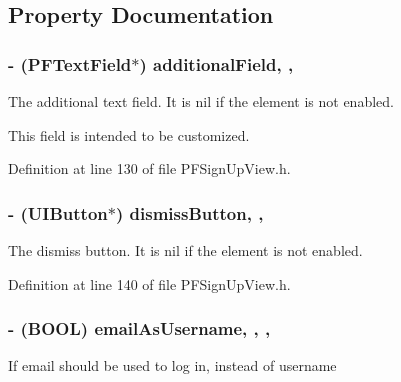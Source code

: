 \subsection{Property Documentation}
\hypertarget{interface_p_f_sign_up_view_ad99c2db623f95565e79418076b0bc111}{}
\subsubsection[{additional\+Field}]{\setlength{\rightskip}{0pt plus 5cm}-\/ ({\bf P\+F\+Text\+Field}$\ast$) additional\+Field\hspace{0.3cm}{\ttfamily [read]}, {\ttfamily [nonatomic]}, {\ttfamily [strong]}}\label{interface_p_f_sign_up_view_ad99c2db623f95565e79418076b0bc111}
The additional text field. It is {\ttfamily nil} if the element is not enabled.

This field is intended to be customized. 

Definition at line 130 of file P\+F\+Sign\+Up\+View.\+h.

\hypertarget{interface_p_f_sign_up_view_a3fce84d1b1027eb046a887f2efe3e156}{}
\subsubsection[{dismiss\+Button}]{\setlength{\rightskip}{0pt plus 5cm}-\/ (U\+I\+Button$\ast$) dismiss\+Button\hspace{0.3cm}{\ttfamily [read]}, {\ttfamily [nonatomic]}, {\ttfamily [strong]}}\label{interface_p_f_sign_up_view_a3fce84d1b1027eb046a887f2efe3e156}
The dismiss button. It is {\ttfamily nil} if the element is not enabled. 

Definition at line 140 of file P\+F\+Sign\+Up\+View.\+h.

\hypertarget{interface_p_f_sign_up_view_ad1e6db575f9bd76e4c952a4b9bf48347}{}
\subsubsection[{email\+As\+Username}]{\setlength{\rightskip}{0pt plus 5cm}-\/ (B\+O\+O\+L) email\+As\+Username\hspace{0.3cm}{\ttfamily [read]}, {\ttfamily [write]}, {\ttfamily [nonatomic]}, {\ttfamily [assign]}}\label{interface_p_f_sign_up_view_ad1e6db575f9bd76e4c952a4b9bf48347}
If email should be used to log in, instead of username

